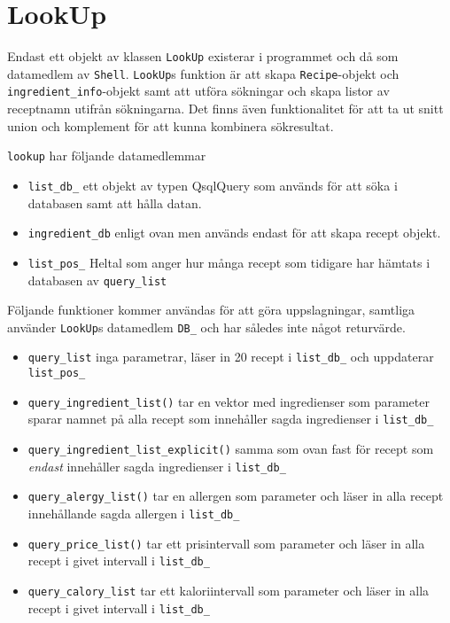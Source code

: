 \section{LookUp}
Endast ett objekt av klassen \verb+LookUp+ existerar i programmet och då som
datamedlem av \verb+Shell+. \verb+LookUp+s funktion är att skapa \verb+Recipe+-objekt och
\verb+ingredient_info+-objekt samt att utföra sökningar och skapa listor av
receptnamn utifrån sökningarna. Det finns även funktionalitet för att
ta ut snitt union och komplement för att kunna kombinera sökresultat.

\verb+lookup+ har följande datamedlemmar
\begin{itemize}
\item   \verb+list_db_+ ett objekt av typen QsqlQuery som används
        för att söka i databasen samt att hålla datan.
\item   \verb+ingredient_db+ enligt ovan men används endast för
        att skapa recept objekt.
\item   \verb+list_pos_+ Heltal som anger hur många recept som tidigare
        har hämtats i databasen av \verb+query_list+
\end{itemize}

Följande funktioner kommer användas för att göra uppslagningar,
samtliga använder \verb+LookUp+s datamedlem \verb+DB_+ och har således 
inte något returvärde. 

\begin{itemize}
\item   \verb+query_list+ inga parametrar, läser in 20 recept i \verb+list_db_+ 
        och uppdaterar \verb+list_pos_+

\item   \verb+query_ingredient_list()+ tar en vektor med ingredienser som
        parameter sparar namnet på alla recept som innehåller sagda ingredienser
        i \verb+list_db_+  

\item   \verb+query_ingredient_list_explicit()+ samma som ovan fast för recept som
        \emph{endast} innehåller sagda ingredienser i \verb+list_db_+  
   
\item   \verb+query_alergy_list()+ tar en allergen som parameter och läser in alla 
        recept innehållande sagda allergen i \verb+list_db_+  

\item   \verb+query_price_list()+ tar ett prisintervall som parameter och läser in
        alla recept i givet intervall i \verb+list_db_+  

\item   \verb+query_calory_list+ tar ett kaloriintervall som parameter och läser in
        alla recept i givet intervall i \verb+list_db_+  
\end{itemize}
 

